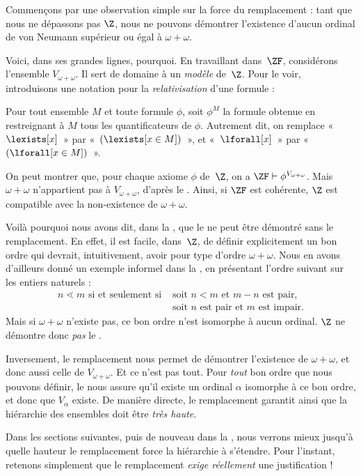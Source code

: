 \documentclass[../../../include/open-logic-section]{subfiles}
\begin{document}

Commençons par une observation simple sur la force du remplacement :
tant que nous ne dépassons pas $\Z$, nous ne pouvons démontrer
l'existence d'aucun ordinal de von Neumann supérieur ou égal à
$\omega + \omega$.

Voici, dans ses grandes lignes, pourquoi. En travaillant dans~$\ZF$,
considérons l'ensemble $V_{\omega+\omega}$. Il sert de domaine à un
\emph{modèle} de~$\Z$. Pour le voir, introduisons une notation pour la
\emph{relativisation} d'une formule :
\begin{defn}
	Pour tout ensemble $M$ et toute formule $\phi$, soit $\phi^M$ la formule
	obtenue en restreignant à $M$ tous les quantificateurs de $\phi$.
	Autrement dit, on remplace «~$\lexists[x]$~» par
	«~$(\lexists[x \in M])$~», et «~$\lforall[x]$~» par
	«~$(\lforall[x \in M])$~».
\end{defn}\noindent
On peut montrer que, pour chaque axiome $\phi$ de~$\Z$, on a
$\ZF \vdash \phi^{V_{\omega+\omega}}$. Mais $\omega+\omega$
n'appartient pas à $V_{\omega+\omega}$, d'après
le . Ainsi, si $\ZF$ est cohérente, $\Z$ est compatible avec
la non-existence de $\omega+\omega$.

Voilà pourquoi nous avons dit, dans la
, que le
 ne peut être
démontré sans le remplacement. En effet, il est facile, dans~$\Z$,
de définir explicitement un bon ordre qui devrait, intuitivement,
avoir pour type d'ordre $\omega+\omega$. Nous en avons d'ailleurs donné
un exemple informel dans la , en présentant
l'ordre suivant sur les entiers naturels :
\begin{align*}
	n \lessdot m \text{ si et seulement si }&
	\text{soit }n < m\text{ et }m-n\text{ est pair,}\\
	& \text{soit $n$ est pair et $m$ est impair.}
\end{align*}
Mais si $\omega+\omega$ n'existe pas, ce bon ordre n'est isomorphe
à aucun ordinal. $\Z$ ne démontre donc \emph{pas}
le .

Inversement, le remplacement nous permet de démontrer l'existence
de $\omega+\omega$, et donc aussi celle de $V_{\omega+\omega}$.
Et ce n'est pas tout. Pour \emph{tout} bon ordre que nous pouvons
définir, le 
nous assure qu'il existe un ordinal $\alpha$ isomorphe à ce bon
ordre, et donc que $V_\alpha$ existe. De manière directe, le
remplacement garantit ainsi que la hiérarchie des ensembles doit
être \emph{très haute}.

Dans les sections suivantes, puis de nouveau dans la
, nous verrons mieux jusqu'à
quelle hauteur le remplacement force la hiérarchie à s'étendre.
Pour l'instant, retenons simplement que le remplacement
\emph{exige réellement} une justification !
\end{document}
